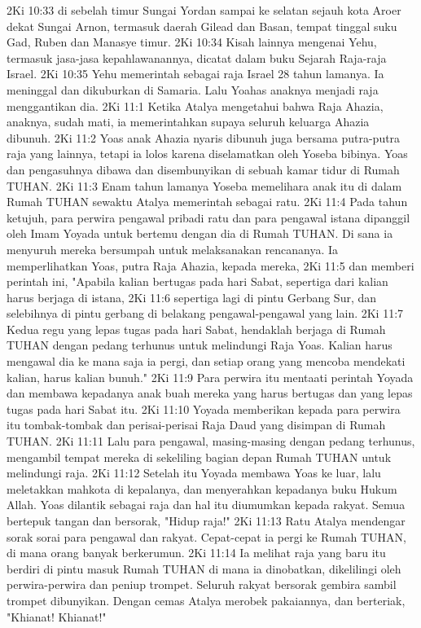 2Ki 10:33  di sebelah timur Sungai Yordan sampai ke selatan sejauh kota Aroer dekat Sungai Arnon, termasuk daerah Gilead dan Basan, tempat tinggal suku Gad, Ruben dan Manasye timur.
2Ki 10:34  Kisah lainnya mengenai Yehu, termasuk jasa-jasa kepahlawanannya, dicatat dalam buku Sejarah Raja-raja Israel.
2Ki 10:35  Yehu memerintah sebagai raja Israel 28 tahun lamanya. Ia meninggal dan dikuburkan di Samaria. Lalu Yoahas anaknya menjadi raja menggantikan dia.
2Ki 11:1  Ketika Atalya mengetahui bahwa Raja Ahazia, anaknya, sudah mati, ia memerintahkan supaya seluruh keluarga Ahazia dibunuh.
2Ki 11:2  Yoas anak Ahazia nyaris dibunuh juga bersama putra-putra raja yang lainnya, tetapi ia lolos karena diselamatkan oleh Yoseba bibinya. Yoas dan pengasuhnya dibawa dan disembunyikan di sebuah kamar tidur di Rumah TUHAN.
2Ki 11:3  Enam tahun lamanya Yoseba memelihara anak itu di dalam Rumah TUHAN sewaktu Atalya memerintah sebagai ratu.
2Ki 11:4  Pada tahun ketujuh, para perwira pengawal pribadi ratu dan para pengawal istana dipanggil oleh Imam Yoyada untuk bertemu dengan dia di Rumah TUHAN. Di sana ia menyuruh mereka bersumpah untuk melaksanakan rencananya. Ia memperlihatkan Yoas, putra Raja Ahazia, kepada mereka,
2Ki 11:5  dan memberi perintah ini, "Apabila kalian bertugas pada hari Sabat, sepertiga dari kalian harus berjaga di istana,
2Ki 11:6  sepertiga lagi di pintu Gerbang Sur, dan selebihnya di pintu gerbang di belakang pengawal-pengawal yang lain.
2Ki 11:7  Kedua regu yang lepas tugas pada hari Sabat, hendaklah berjaga di Rumah TUHAN dengan pedang terhunus untuk melindungi Raja Yoas. Kalian harus mengawal dia ke mana saja ia pergi, dan setiap orang yang mencoba mendekati kalian, harus kalian bunuh."
2Ki 11:9  Para perwira itu mentaati perintah Yoyada dan membawa kepadanya anak buah mereka yang harus bertugas dan yang lepas tugas pada hari Sabat itu.
2Ki 11:10  Yoyada memberikan kepada para perwira itu tombak-tombak dan perisai-perisai Raja Daud yang disimpan di Rumah TUHAN.
2Ki 11:11  Lalu para pengawal, masing-masing dengan pedang terhunus, mengambil tempat mereka di sekeliling bagian depan Rumah TUHAN untuk melindungi raja.
2Ki 11:12  Setelah itu Yoyada membawa Yoas ke luar, lalu meletakkan mahkota di kepalanya, dan menyerahkan kepadanya buku Hukum Allah. Yoas dilantik sebagai raja dan hal itu diumumkan kepada rakyat. Semua bertepuk tangan dan bersorak, "Hidup raja!"
2Ki 11:13  Ratu Atalya mendengar sorak sorai para pengawal dan rakyat. Cepat-cepat ia pergi ke Rumah TUHAN, di mana orang banyak berkerumun.
2Ki 11:14  Ia melihat raja yang baru itu berdiri di pintu masuk Rumah TUHAN di mana ia dinobatkan, dikelilingi oleh perwira-perwira dan peniup trompet. Seluruh rakyat bersorak gembira sambil trompet dibunyikan. Dengan cemas Atalya merobek pakaiannya, dan berteriak, "Khianat! Khianat!"
